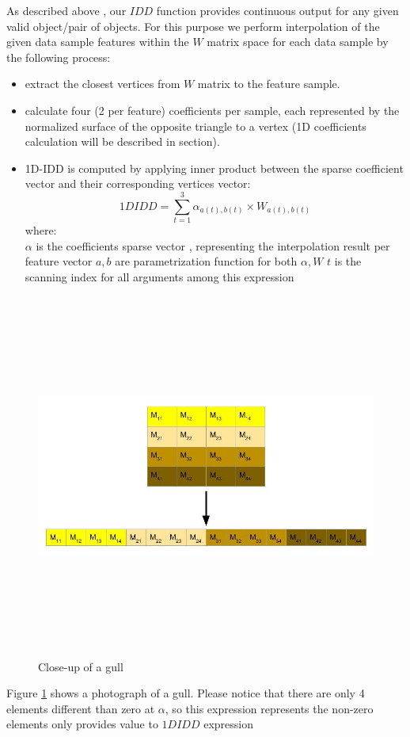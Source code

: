 	As described above , our $IDD$ function provides continuous output for any given valid object/pair of objects. 
	For this purpose we perform interpolation of the given data sample features within the $W$ matrix space for each data sample by the following process:
	\begin{itemize}
		\item extract the closest vertices from $W$ matrix to the feature sample. 
		\item calculate four (2 per feature) coefficients per sample, each represented by the normalized surface of the opposite triangle to a vertex (1D coefficients calculation will be described in section). 
		\item 1D-IDD is computed by applying inner product between the sparse coefficient vector and their corresponding vertices vector:\\
		\begin{equation}
		1DIDD = \sum_{t=1}^{3}\alpha_{a(t),b(t)} \times W_{a(t),b(t)}
		\end{equation}
		where:\\
		$\alpha$ is the coefficients sparse vector , representing the interpolation result per feature vector
		$a , b$ are parametrization function for both $\alpha , W$
		$t$ is the scanning index for all arguments among this expression
	\end{itemize}
	
	\begin{figure}
	  \centering
	  	\includegraphics[width=\linewidth,height=12cm,keepaspectratio]{Figures/flatten}

	  \caption{Close-up of a gull}
	  \label{fig:gull}
	\end{figure}
	Figure \ref{fig:gull} shows a photograph of a gull.	
	Please notice that there are only 4 elements different than zero at $\alpha$, so this expression represents the non-zero elements only provides value to $1DIDD$ expression \\
	
